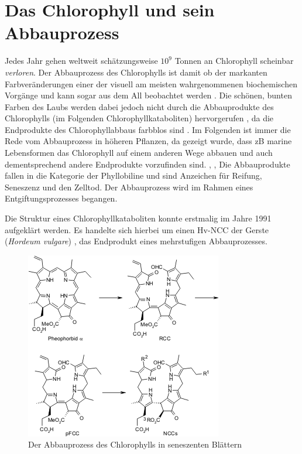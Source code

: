 \chapter{Das Chlorophyll und sein Abbauprozess}

Jedes Jahr gehen weltweit schätzungsweise $10^{9}$ Tonnen an Chlorophyll scheinbar \textit{verloren}. Der Abbauprozess des Chlorophylls ist damit ob der markanten Farbveränderungen einer der visuell am meisten wahrgenommenen biochemischen Vorgänge und kann sogar aus dem All beobachtet werden \cite{ChlorophyllBreakdown}. Die schönen, bunten Farben des Laubs werden dabei jedoch nicht durch die Abbauprodukte des Chlorophylls (im Folgenden Chlorophyllkataboliten) hervorgerufen  \cite{DegradationChlorophyll}, da die Endprodukte des Chlorophyllabbaus farbblos sind \cite{ChlorophyllBreakdown}. Im Folgenden ist immer die Rede vom Abbauprozess in höheren Pflanzen, da gezeigt wurde, dass \gls{zB} marine Lebensformen das Chlorophyll auf einem anderen Wege abbauen und auch dementsprechend andere Endprodukte vorzufinden sind. \cite{ChlorophyllBreakdown}, \cite{ErsterKatabolit}, \cite{ChlorophyllCataboliteDifferent} Die Abbauprodukte fallen in die Kategorie der Phyllobiline und sind Anzeichen für Reifung, Seneszenz und den Zelltod. Der Abbauprozess wird im Rahmen eines Entgiftungsprozesses begangen. \cite{ChlorophyllKatabolitenalsZeichenReifung}

Die Struktur eines Chlorophyllkataboliten konnte erstmalig im Jahre 1991 aufgeklärt werden. Es handelte sich hierbei um einen Hv-\gls{NCC} der Gerste (\textit{Hordeum vulgare}) \cite{ErsterKatabolit}, das Endprodukt eines mehrstufigen Abbauprozesses. 

\begin{figure}[hbtp]
  \centering
  \includegraphics[scale=0.57]{figures/Kapitel2/VWA_Schema_Chlorophyllabbau.png}
  \caption[Abbauprozess des Chlorophylls, Quelle: http://www.organische-chemie.ch/chemie/2007nov/antioxidantien.shtm (Zugegriffen am: 05.11.2017)]{Der Abbauprozess des Chlorophylls in seneszenten Blättern}
  \label{fig:Chlorophyllabbau}
\end{figure}

